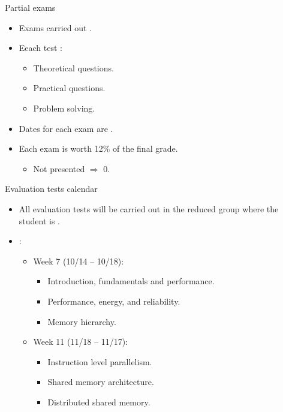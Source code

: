 \begin{frame}[t]{Partial exams}
\begin{itemize}
  \item Exams carried out .

  \item Eeach test :
    \begin{itemize}
      \item Theoretical questions.
      \item Practical questions.
      \item Problem solving.
    \end{itemize}

  \item Dates for each exam are .

  \item Each exam is worth 12\% of the final grade.
    \begin{itemize}
      \item Not presented $\Rightarrow$ 0.
    \end{itemize}
\end{itemize}
\end{frame}

\begin{frame}[t]{Evaluation tests calendar}
\begin{itemize}
  \item All evaluation tests will be carried out in the reduced group
        where the student is .

  \vfill
  \item {}:
  \begin{itemize}
    \item Week 7 (10/14 -- 10/18): 
      \begin{itemize}
        \item Introduction, fundamentals and performance.
        \item Performance, energy, and reliability.
        \item Memory hierarchy.
      \end{itemize}
    \item Week 11 (11/18 -- 11/17):
      \begin{itemize}
        \item Instruction level parallelism.
        \item Shared memory architecture.
        \item Distributed shared memory.
      \end{itemize}
  \end{itemize}
\end{itemize}
\end{frame}


